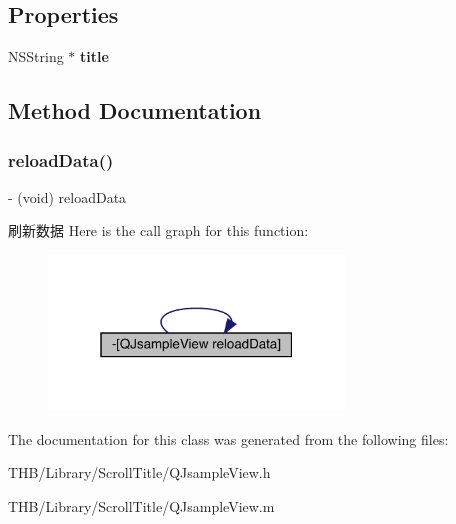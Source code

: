\subsection*{Properties}
\begin{DoxyCompactItemize}
\item 
\mbox{\label{interface_q_jsample_view_a3df87d725aa85f384626527e36609799}} 
N\+S\+String $\ast$ {\bfseries title}
\end{DoxyCompactItemize}


\subsection{Method Documentation}
\mbox{\label{interface_q_jsample_view_a06548fa44351318d09c188c84c6942f8}} 
\subsubsection{\texorpdfstring{reload\+Data()}{reloadData()}}
{\footnotesize\ttfamily -\/ (void) reload\+Data \begin{DoxyParamCaption}{ }\end{DoxyParamCaption}}

刷新数据 Here is the call graph for this function\+:\nopagebreak
\begin{figure}[H]
\begin{center}
\leavevmode
\includegraphics[width=223pt]{interface_q_jsample_view_a06548fa44351318d09c188c84c6942f8_cgraph}
\end{center}
\end{figure}


The documentation for this class was generated from the following files\+:\begin{DoxyCompactItemize}
\item 
T\+H\+B/\+Library/\+Scroll\+Title/Q\+Jsample\+View.\+h\item 
T\+H\+B/\+Library/\+Scroll\+Title/Q\+Jsample\+View.\+m\end{DoxyCompactItemize}
